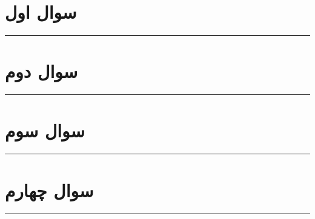 \documentclass[a4paper,10pt]{article}
\begin{document}


\section{سوال اول}

\bigskip
\bigskip
\rule{\linewidth}{0.4pt}

\section{سوال دوم}


\bigskip
\bigskip
\rule{\linewidth}{0.4pt}

\section{سوال سوم}



\bigskip
\bigskip
\rule{\linewidth}{0.4pt}

\section{سوال چهارم}



\bigskip
\bigskip
\rule{\linewidth}{0.4pt}


\end{document}

